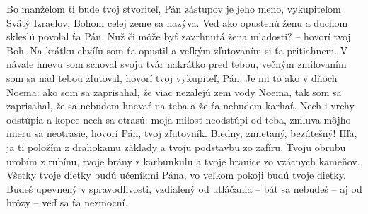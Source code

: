 Bo manželom ti bude tvoj stvoriteľ, Pán zástupov je jeho meno, vykupiteľom Svätý Izraelov, Bohom celej zeme sa nazýva.
\versseparator
Veď ako opustenú ženu a duchom skleslú povolal ťa Pán.
Nuž či môže byť zavrhnutá žena mladosti? – hovorí tvoj Boh.
Na krátku chvíľu som ťa opustil a veľkým zľutovaním si ťa pritiahnem.
V návale hnevu som schoval svoju tvár nakrátko pred tebou, večným zmilovaním som sa nad tebou zľutoval, hovorí tvoj vykupiteľ, Pán.
\versseparator
Je mi to ako v dňoch Noema: ako som sa zaprisahal, že viac nezalejú zem vody Noema, tak som sa zaprisahal, že sa nebudem hnevať na teba a že ťa nebudem karhať. Nech i vrchy odstúpia a kopce nech sa otrasú: moja milosť neodstúpi od teba, zmluva môjho mieru sa neotrasie, hovorí Pán, tvoj zľutovník.
\versseparator
Biedny, zmietaný, bezútešný! 
Hľa, ja ti položím z drahokamu základy a tvoju podstavbu zo zafíru.
Tvoju obrubu urobím z rubínu, tvoje brány z karbunkulu a tvoje hranice zo vzácnych kameňov. 
Všetky tvoje dietky budú učeníkmi Pána, vo veľkom pokoji budú tvoje dietky.
Budeš upevnený v spravodlivosti, vzdialený od utláčania – báť sa nebudeš – aj od hrôzy – veď sa ťa nezmocní.